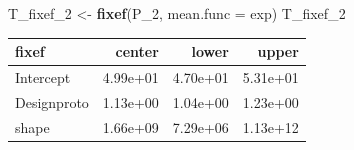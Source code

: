\documentclass[]{svmono}
\newenvironment{Shaded}{\begin{snugshade}}{\end{snugshade}}
\newcommand{\KeywordTok}[1]{\textcolor[rgb]{0.13,0.29,0.53}{\textbf{#1}}}
\newcommand{\DataTypeTok}[1]{\textcolor[rgb]{0.13,0.29,0.53}{#1}}
\newcommand{\DecValTok}[1]{\textcolor[rgb]{0.00,0.00,0.81}{#1}}
\newcommand{\StringTok}[1]{\textcolor[rgb]{0.31,0.60,0.02}{#1}}
\newcommand{\OperatorTok}[1]{\textcolor[rgb]{0.81,0.36,0.00}{\textbf{#1}}}
\newcommand{\NormalTok}[1]{#1}
\theoremstyle{definition}
\theoremstyle{definition}
\theoremstyle{definition}
\theoremstyle{remark}
\begin{document}
\begin{Shaded}
\end{Shaded}

\begin{Shaded}
\begin{Highlighting}[]
\NormalTok{T_fixef_}\DecValTok{2}\NormalTok{ <-}\StringTok{ }\KeywordTok{fixef}\NormalTok{(P_}\DecValTok{2}\NormalTok{, }\DataTypeTok{mean.func =}\NormalTok{ exp)}
\NormalTok{T_fixef_}\DecValTok{2}
\end{Highlighting}
\end{Shaded}

\begin{longtable}[]{@{}lrrr@{}}
\toprule
fixef & center & lower & upper\tabularnewline
\midrule
\endhead
Intercept & 4.99e+01 & 4.70e+01 & 5.31e+01\tabularnewline
Designproto & 1.13e+00 & 1.04e+00 & 1.23e+00\tabularnewline
shape & 1.66e+09 & 7.29e+06 & 1.13e+12\tabularnewline
\bottomrule
\end{longtable}
\end{document}
